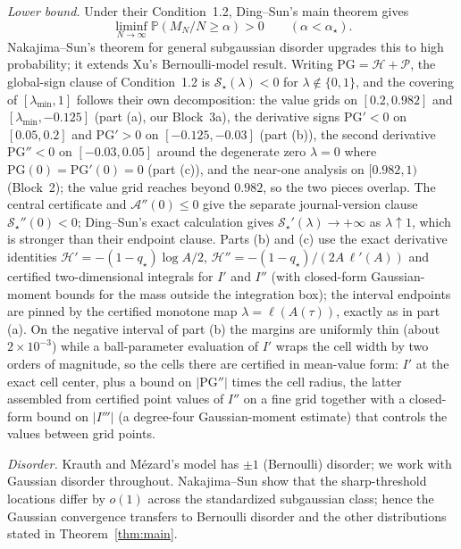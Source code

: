 \documentclass[11pt]{article}
\newcommand{\PP}{\mathbb{P}}
\begin{document}
\emph{Lower bound.} Under their Condition~1.2, Ding--Sun's main theorem gives
\[
 \liminf_{N\to\infty}\PP(M_N/N\ge\alpha)>0
 \qquad (\alpha<\alpha_\star).
\]
Nakajima--Sun's theorem for general subgaussian disorder upgrades this to high
probability; it extends Xu's Bernoulli-model result. Writing
$\mathrm{PG}=\mathcal H+\mathcal P$, the global-sign clause of
Condition~1.2 is $\mathscr S_\star(\lambda)<0$ for
$\lambda\notin\{0,1\}$, and the covering of
$[\lambda_{\min},1]$ follows their own decomposition: the value grids on
$[0.2,0.982]$ and $[\lambda_{\min},-0.125]$ (part (a), our Block~3a), the
derivative signs $\mathrm{PG}'<0$ on $[0.05,0.2]$ and $\mathrm{PG}'>0$ on
$[-0.125,-0.03]$ (part (b)), the second derivative $\mathrm{PG}''<0$ on
$[-0.03,0.05]$ around the degenerate zero $\lambda=0$ where
$\mathrm{PG}(0)=\mathrm{PG}'(0)=0$ (part (c)), and the near-one analysis on
 $[0.982,1)$ (Block~2); the value grid reaches beyond $0.982$, so the two
 pieces overlap. The central certificate and $\mathcal A''(0)\le0$
 \cite[discussion following eq.~(2.35)]{ding2018capacity} give the
 separate journal-version clause $\mathscr S_\star''(0)<0$; Ding--Sun's exact
 calculation \cite[proof of Theorem~1.4]{ding2018capacity} gives
 $\mathscr S_\star'(\lambda)\to+\infty$ as
 $\lambda\uparrow1$, which is stronger than their endpoint clause. Parts (b)
 and (c) use the exact derivative identities
$\mathcal H'=-(1-q_\star)\log A/2$, $\mathcal
H''=-(1-q_\star)/(2A\,\ell'(A))$ and certified two-dimensional integrals for
$I'$ and $I''$ (with closed-form Gaussian-moment bounds for the mass outside
the integration box); the interval endpoints are pinned by the certified
monotone map $\lambda=\ell(A(\tau))$, exactly as in part (a). On the negative
interval of part (b) the margins are uniformly thin (about $2\times10^{-3}$)
while a ball-parameter evaluation of $I'$ wraps the cell width by two orders
of magnitude, so the cells there are certified in mean-value form: $I'$ at
the exact cell center, plus a bound on $|\mathrm{PG}''|$ times the cell
radius, the latter assembled from certified point values of $I''$ on a fine
grid together with a closed-form bound on $|I'''|$ (a degree-four
Gaussian-moment estimate) that controls the values between grid points.

\emph{Disorder.} Krauth and M\'ezard's model has $\pm1$ (Bernoulli) disorder;
we work with Gaussian disorder throughout. Nakajima--Sun show that the
sharp-threshold locations differ by $o(1)$ across the standardized subgaussian
class; hence the Gaussian convergence transfers to Bernoulli disorder and the
other distributions stated in Theorem~\ref{thm:main}.
\end{document}
